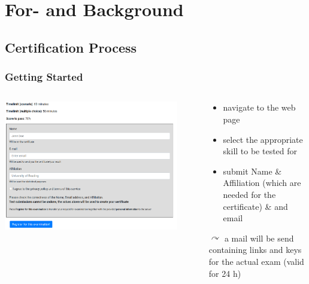 \section[For- and Background]{For- and Background}



\subsection{Certification Process}

\begin{frame}
  \frametitle{Getting Started}
  \begin{columns}
    \begin{column}{.5\textwidth}
       \centering
      \includegraphics[width=0.9\textwidth]{images/getting_started}
    \end{column}
    \begin{column}{.5\textwidth}
      \begin{itemize}[<+->]
       \item navigate to the web page
       \item select the appropriate skill to be tested for
       \item submit Name \& Affiliation (which are needed for the certificate) \& and email
      \end{itemize}
      \pause
      $\curvearrowright$ a mail will be send containing links and keys for the actual exam (valid for 24 h)
    \end{column}
  \end{columns}
  
\end{frame}


